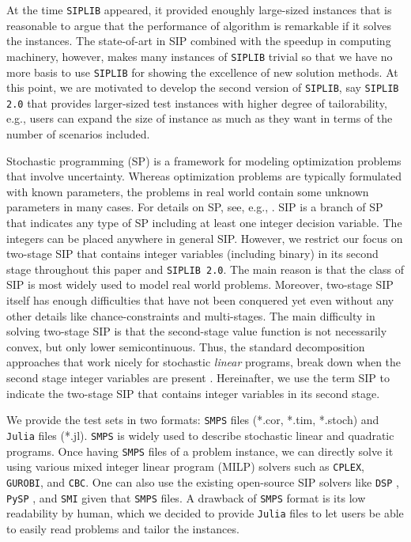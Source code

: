 At the time \texttt{SIPLIB} appeared, it provided enoughly large-sized instances that is reasonable to argue that the performance of algorithm is remarkable if it solves the instances. The state-of-art in SIP combined with the speedup in computing machinery, however, makes many instances of \texttt{SIPLIB} trivial so that we have no more basis to use \texttt{SIPLIB} for showing the excellence of new solution methods. At this point, we are motivated to develop the second version of \texttt{SIPLIB}, say \texttt{SIPLIB 2.0} that provides larger-sized test instances with higher degree of tailorability, e.g., users can expand the size of instance as much as they want in terms of the number of scenarios included.

Stochastic programming (SP) is a framework for modeling optimization problems that involve uncertainty. Whereas optimization problems are typically formulated with known parameters, the problems in real world contain some unknown parameters in many cases. For details on SP, see, e.g., \cite{web:SPS,book:BL2011}. SIP is a branch of SP that indicates any type of SP including at least one integer decision variable. The integers can be placed anywhere in general SIP. However, we restrict our focus on two-stage SIP that contains integer variables (including binary) in its second stage throughout this paper and \texttt{SIPLIB 2.0}. The main reason is that the class of SIP is most widely used to model real world problems. Moreover, two-stage SIP itself has enough difficulties that have not been conquered yet even without any other details like chance-constraints and multi-stages. The main difficulty in solving two-stage SIP is that the second-stage value function is not necessarily convex, but only lower semicontinuous. Thus, the standard decomposition approaches that work nicely for stochastic \textit{linear} programs, break down when the second stage integer variables are present \cite{journal:AG2004}. Hereinafter, we use the term SIP to indicate the two-stage SIP that contains integer variables in its second stage.

We provide the test sets in two formats: \texttt{SMPS} files (*.cor, *.tim, *.stoch) and \texttt{Julia} files (*.jl). \texttt{SMPS} is widely used to describe stochastic linear and quadratic programs. Once having \texttt{SMPS} files of a problem instance, we can directly solve it using various mixed integer linear program (MILP) solvers such as \texttt{CPLEX}, \texttt{GUROBI}, and \texttt{CBC}. One can also use the existing open-source SIP solvers like \texttt{DSP} \cite{journal:KZ2015}, \texttt{PySP} \cite{journal:WWH2012}, and \texttt{SMI} \cite{web:SMI} given that \texttt{SMPS} files. A drawback of \texttt{SMPS} format is its low readability by human, which we decided to provide \texttt{Julia} files to let users be able to easily read problems and tailor the instances.

